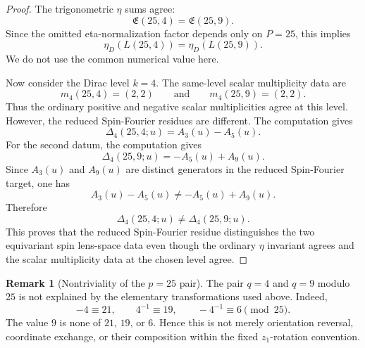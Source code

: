 \documentclass{article}
\theoremstyle{definition}
\newtheorem{remark}[remark]{Remark}
\numberwithin{equation}{section}
\begin{document}
\begin{proof}
The trigonometric $\eta$ sums agree:
\begin{equation}
\mathfrak E(25,4)=\mathfrak E(25,9).
\end{equation}
Since the omitted eta-normalization factor depends only on $P=25$, this implies
\begin{equation}
\eta_D(L(25,4))=\eta_D(L(25,9)).
\end{equation}
We do not use the common numerical value here.

Now consider the Dirac level $k=4$.  The same-level scalar multiplicity data are
\begin{equation}
m_4(25,4)=(2,2)
\qquad\text{and}\qquad
m_4(25,9)=(2,2).
\end{equation}
Thus the ordinary positive and negative scalar multiplicities agree at this level.  However, the reduced Spin-Fourier residues are different.  The computation gives
\begin{equation}
\Delta_4(25,4;u)=A_3(u)-A_5(u).
\end{equation}
For the second datum, the computation gives
\begin{equation}
\Delta_4(25,9;u)=-A_5(u)+A_9(u).
\end{equation}
Since $A_3(u)$ and $A_9(u)$ are distinct generators in the reduced Spin-Fourier target, one has
\begin{equation}
A_3(u)-A_5(u)\neq -A_5(u)+A_9(u).
\end{equation}
Therefore
\begin{equation}
\Delta_4(25,4;u)\neq \Delta_4(25,9;u).
\end{equation}
This proves that the reduced Spin-Fourier residue distinguishes the two equivariant spin lens-space data even though the ordinary $\eta$ invariant agrees and the scalar multiplicity data at the chosen level agree.
\end{proof}

\begin{remark}[Nontriviality of the $p=25$ pair]
The pair $q=4$ and $q=9$ modulo $25$ is not explained by the elementary transformations used above.  Indeed,
\begin{equation}
-4\equiv 21,
\qquad
4^{-1}\equiv 19,
\qquad
-4^{-1}\equiv 6
\pmod{25}.
\end{equation}
The value $9$ is none of $21$, $19$, or $6$.  Hence this is not merely orientation reversal, coordinate exchange, or their composition within the fixed $z_1$-rotation convention.
\end{remark}
\end{document}
